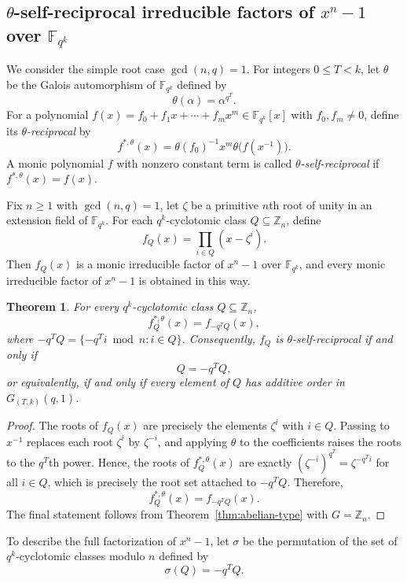 \documentclass[pdflatex,sn-mathphys-num]{sn-jnl}%
\theoremstyle{thmstyleone}%
\newtheorem{theorem}{Theorem}%
\theoremstyle{thmstyletwo}%
\theoremstyle{thmstylethree}%
\newcommand{\Z}{\mathbb{Z}}
\newcommand{\F}{\mathbb{F}}
\begin{document}
\subsection{\texorpdfstring{$\theta$}{theta}-self-reciprocal irreducible factors of $x^n-1$ over $\F_{q^k}$}

We consider the simple root case $\gcd(n,q)=1$. For integers $0\leq T<k$, let $\theta$ be the Galois automorphism of $\F_{q^k}$ defined by
\[
\theta(\alpha)=\alpha^{q^T}.
\]
For a polynomial
$
f(x)=f_0+f_1x+\cdots+f_mx^m\in \F_{q^k}[x]
$
with $f_0, f_m\ne 0$, define its \emph{$\theta$-reciprocal} by
\[
f^{\ast,\theta}(x)=\theta(f_0)^{-1}x^m\theta\bigl(f(x^{-1})\bigr).
\]
A monic polynomial $f$ with nonzero constant term is called \emph{$\theta$-self-reciprocal} if
$
f^{\ast,\theta}(x)=f(x)$.


Fix $n\ge 1$ with $\gcd(n,q)=1$, let $\zeta$ be a primitive $n$th root of unity in an extension field of   $\F_{q^k}$. For each $q^k$-cyclotomic class $Q\subseteq \Z_n$, define
\[
f_Q(x)=\prod_{i\in Q}(x-\zeta^i).
\]
Then $f_Q(x)$ is a monic irreducible factor of $x^n-1$ over $\F_{q^k}$, and every monic irreducible factor of $x^n-1$  is obtained  in this way.

\begin{theorem}\label{thm:reciprocal-coset}
For every $q^k$-cyclotomic class $Q\subseteq \Z_n$,
\[
f_Q^{\ast,\theta}(x)=f_{-q^TQ}(x),
\]
where
$
-q^TQ=\{-q^Ti \bmod n : i\in Q\}$.
Consequently, $f_Q$ is $\theta$-self-reciprocal if and only if
\[
Q=-q^TQ,
\]
or equivalently, if and only if every element of $Q$ has additive order in $G_{(T,k)}(q,1)$.
\end{theorem}

\begin{proof}
The roots of $f_Q(x)$ are precisely the elements $\zeta^i$ with $i\in Q$. Passing to $x^{-1}$ replaces each root $\zeta^i$ by $\zeta^{-i}$, and applying $\theta$ to the coefficients raises the roots to the $q^T$th power. Hence, the roots of $f_Q^{\ast,\theta}(x)$ are exactly
$
(\zeta^{-i})^{q^T}=\zeta^{-q^Ti}$ for all $i\in Q$,
which is precisely the root set attached to $-q^TQ$. Therefore,
\[
f_Q^{\ast,\theta}(x)=f_{-q^TQ}(x).
\]
The final statement follows from Theorem~\ref{thm:abelian-type} with $G=\Z_n$.
\end{proof}

To describe the full factorization of $x^n-1$, let $\sigma$ be the permutation of the set of $q^k$-cyclotomic classes modulo $n$ defined by
\[
\sigma(Q)=-q^TQ.
\]
\end{document}

